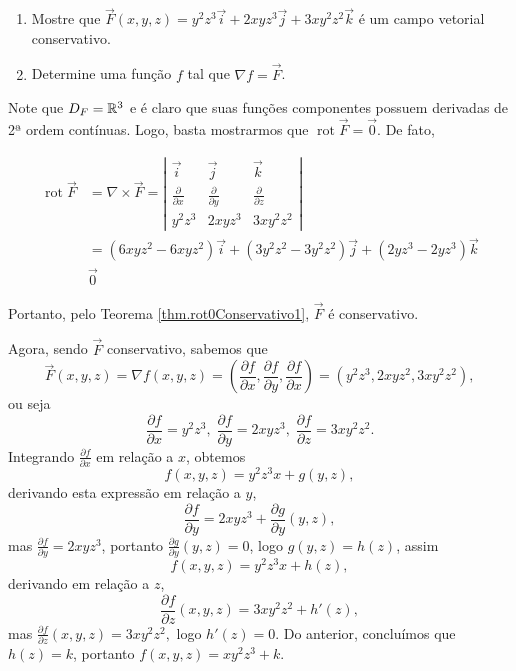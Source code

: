 \begin{example}
    \begin{enumerate}
        \item Mostre que \(\overrightarrow{F}(x,y,z) = y^2z^3\overrightarrow{i} + 2xyz^3\overrightarrow{j} + 3xy^2z^2\overrightarrow{k}\) é um campo vetorial conservativo.
        \item Determine uma função \(f\) tal que \(\nabla f = \overrightarrow{F}\).
    \end{enumerate}

    Note que \(D_F = \mathbb{R}^3\) e é claro que suas funções componentes possuem derivadas de 2ª ordem contínuas. Logo, basta mostrarmos que \(\operatorname{rot}\overrightarrow{F} = \overrightarrow{0}\). De fato, 

        \begin{align*}
            \operatorname{rot}\overrightarrow{F}
                & = \nabla \times \overrightarrow{F} = \left|\begin{matrix}
    \overrightarrow{i} & \overrightarrow{j} & \overrightarrow{k}  \\
    \frac{\partial}{\partial x} & \frac{\partial}{\partial y} & \frac{\partial}{\partial z} \\
     y^2 z^3 & 2xyz^3 & 3xy^2z^2
\end{matrix}\right|\\
                & = (6xyz^2 - 6xyz^2)\overrightarrow{i} + (3y^2z^2 - 3y^2z^2)\overrightarrow{j} + (2yz^3 - 2yz^3)\overrightarrow{k}\\
                & \overrightarrow{0}
        \end{align*}

    Portanto, pelo Teorema \ref{thm.rot0Conservativo1}, \(\overrightarrow{F}\) é conservativo.

    Agora, sendo \(\overrightarrow{F}\) conservativo, sabemos que \[ \overrightarrow{F}(x,y,z) = \nabla f(x,y,z) = \left( \frac{\partial f}{\partial x}, \frac{\partial f}{\partial y}, \frac{\partial f}{\partial x} \right) = \left( y^2z^3, 2xyz^2, 3xy^2z^2 \right),\] ou seja \[\frac{\partial f}{\partial x} = y^2 z^3,\; \frac{\partial f}{\partial y} = 2xyz^3,\; \frac{\partial f}{\partial z} = 3xy^2z^2.\] Integrando \(\frac{\partial f}{\partial x}\) em relação a \(x\), obtemos \[f(x,y,z) = y^2 z^3 x + g(y,z),\] derivando esta expressão em relação a \(y\), \[\frac{\partial f}{\partial y} = 2xyz^3 + \frac{\partial g}{\partial y}(y,z),\] mas \(\frac{\partial f}{\partial y} = 2xyz^3\), portanto \(\frac{\partial g}{\partial y}(y,z) = 0 \), logo \(g(y,z) = h(z)\), assim \[f(x,y,z) = y^2 z^3 x + h(z),\] derivando em relação a \(z\), \[\frac{\partial f}{\partial z}(x,y,z) = 3xy^2z^2 + h'(z),\] mas \(\frac{\partial f}{\partial z}(x,y,z) = 3xy^2z^2,\) logo \(h'(z) = 0\). Do anterior, concluímos que \(h(z) = k\), portanto \(f(x,y,z) = xy^2z^3 + k\).
\end{example}


